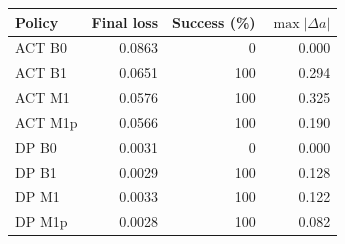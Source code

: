 \begin{tabular}{lrrr}
\toprule
Policy & Final loss & Success (\%) & $\max|\Delta a|$ \\
\midrule
ACT B0 & 0.0863 & 0 & 0.000 \\
ACT B1 & 0.0651 & 100 & 0.294 \\
ACT M1 & 0.0576 & 100 & 0.325 \\
ACT M1p & 0.0566 & 100 & 0.190 \\
DP B0 & 0.0031 & 0 & 0.000 \\
DP B1 & 0.0029 & 100 & 0.128 \\
DP M1 & 0.0033 & 100 & 0.122 \\
DP M1p & 0.0028 & 100 & 0.082 \\
\bottomrule
\end{tabular}
